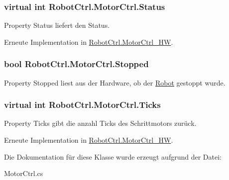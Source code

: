 \hypertarget{class_robot_ctrl_1_1_motor_ctrl_ac0f2ebafce89738ca669eaa920a30c80}{
\subsubsection[{Status}]{\setlength{\rightskip}{0pt plus 5cm}virtual int RobotCtrl.MotorCtrl.Status}}
\label{class_robot_ctrl_1_1_motor_ctrl_ac0f2ebafce89738ca669eaa920a30c80}
Property Status liefert den Status. 

Erneute Implementation in \hyperlink{class_robot_ctrl_1_1_motor_ctrl___h_w_a0c39f88363e68b382cf946f37fe98e16}{RobotCtrl.MotorCtrl\_\-HW}.

\hypertarget{class_robot_ctrl_1_1_motor_ctrl_a5d2599ad295ece36d107cc7cb117d9c9}{
\subsubsection[{Stopped}]{\setlength{\rightskip}{0pt plus 5cm}bool RobotCtrl.MotorCtrl.Stopped}}
\label{class_robot_ctrl_1_1_motor_ctrl_a5d2599ad295ece36d107cc7cb117d9c9}
Property Stopped liest aus der Hardware, ob der \hyperlink{class_robot_ctrl_1_1_robot}{Robot} gestoppt wurde. \hypertarget{class_robot_ctrl_1_1_motor_ctrl_a625a8335b71115e58d2d04c59027fb81}{
\subsubsection[{Ticks}]{\setlength{\rightskip}{0pt plus 5cm}virtual int RobotCtrl.MotorCtrl.Ticks}}
\label{class_robot_ctrl_1_1_motor_ctrl_a625a8335b71115e58d2d04c59027fb81}
Property Ticks gibt die anzahl Ticks des Schrittmotors zur\"{u}ck. 

Erneute Implementation in \hyperlink{class_robot_ctrl_1_1_motor_ctrl___h_w_a22603ba1614f7f9eb88f2b7ea0a4c700}{RobotCtrl.MotorCtrl\_\-HW}.



Die Dokumentation für diese Klasse wurde erzeugt aufgrund der Datei:\begin{DoxyCompactItemize}
\item 
MotorCtrl.cs\end{DoxyCompactItemize}
